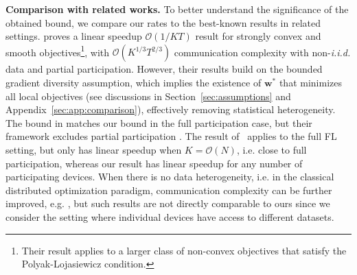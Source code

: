 \textbf{Comparison with related works.} To better understand the significance of the obtained bound, we compare our rates to the best-known results in related settings. \cite{haddadpour2019convergence} proves a linear speedup $\mathcal{O}(1/KT)$ result for strongly convex and smooth objectives\footnote{Their result applies to a larger class of non-convex objectives that satisfy the Polyak-Lojasiewicz condition.}, with $\mathcal{O}(K^{1/3}T^{2/3})$ communication complexity with non-\emph{i.i.d.} data and partial participation. However, their results build on the bounded gradient diversity assumption, which implies the existence of $\mathbf{w}^*$ that minimizes all local objectives (see discussions in Section~\ref{sec:assumptions} and Appendix~\ref{sec:app:comparison}), effectively removing statistical heterogeneity. The bound in \cite{koloskova2020unified} matches our bound in the full participation case, but their framework excludes partial participation \cite[Proposition 1]{koloskova2020unified}. The result of~\cite{karimireddy2019scaffold} applies to the full FL setting, but only has linear speedup when $K=\mathcal{O}(N)$, i.e. close to full participation, whereas our result has linear speedup for any number of participating devices. When there is no data heterogeneity, i.e. in the classical distributed optimization paradigm, communication complexity can be further improved, e.g. \cite{woodworth2020local,woodworth2020minibatch}, but such results are not directly comparable to ours since we consider the setting where individual devices have access to different datasets.

\begin{comment}
	In this overparameterized setting, we prove a geometric convergence rate (see Section~\ref{sec:overparameterized}), 
	thus improving on the rate in \cite{haddadpour2019convergence} with
	better communication complexity. 
\end{comment}

